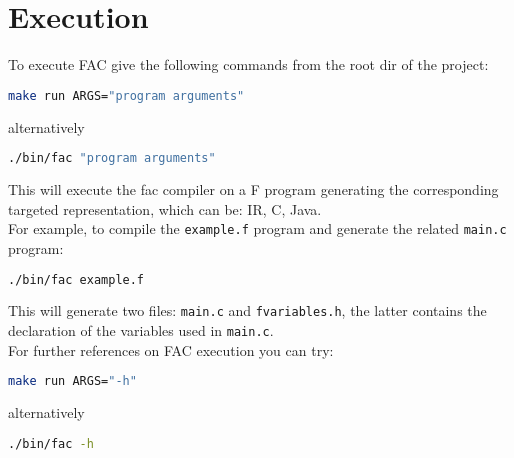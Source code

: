\section{Execution}

To execute FAC give the following commands from the root dir of the project:
\begin{lstlisting}[language=bash,
caption={FAC execution},captionpos=b,frame=single]
make run ARGS="program arguments"
\end{lstlisting}
alternatively
\begin{lstlisting}[language=bash,
caption={FAC execution (explicit)},captionpos=b,frame=single]
./bin/fac "program arguments"
\end{lstlisting}
This will execute the fac compiler on a F program generating the corresponding
targeted representation, which can be: IR, C, Java.
\\
For example, to compile the \verb|example.f| program and generate the related 
\verb|main.c| program:
\begin{lstlisting}[language=bash,
caption={FAC execution - example},captionpos=b,frame=single]
./bin/fac example.f
\end{lstlisting}
This will generate two files: \verb|main.c| and \verb|fvariables.h|, 
the latter contains the declaration of the variables used in \verb|main.c|.
\\
For further references on FAC execution you can try:
\begin{lstlisting}[language=bash,
caption={FAC execution - help mode},captionpos=b,frame=single]
make run ARGS="-h"
\end{lstlisting}
alternatively
\begin{lstlisting}[language=bash,
caption={FAC execution - help mode (explicit)},captionpos=b,frame=single]
./bin/fac -h
\end{lstlisting}